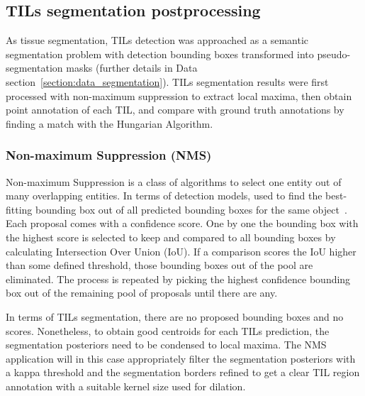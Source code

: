 \subsection{TILs segmentation postprocessing}
As tissue segmentation, TILs detection was approached as a semantic
segmentation problem with detection bounding boxes transformed into
pseudo-segmentation masks (further details in Data section~\ref{section:data_segmentation}).
TILs segmentation results were first processed with non-maximum suppression
to extract local maxima, then obtain point annotation of each TIL, and compare
with ground truth annotations by finding a match with the Hungarian Algorithm.

\subsubsection{Non-maximum Suppression (NMS)}
Non-maximum Suppression is a class of algorithms to select
one entity out of many overlapping entities. In terms of
detection models, used to find the best-fitting bounding box out of all predicted
bounding boxes for the same object~\cite{bodla2017soft}.
Each proposal comes with a confidence score. One by one the bounding box with
the highest score is selected to keep and compared to all bounding boxes by calculating Intersection Over Union (IoU).
If a comparison scores the IoU higher than some defined threshold,
those bounding boxes out of the pool are eliminated.
The process is repeated by picking the highest confidence bounding box out of the
remaining pool of proposals until there are any.

In terms of TILs segmentation, there are no proposed bounding boxes and no scores.
Nonetheless, to obtain good centroids for each TILs prediction, the segmentation posteriors
need to be condensed to local maxima. The NMS application will in this case appropriately
filter the segmentation posteriors with a kappa threshold and the segmentation borders
refined to get a clear TIL region annotation with a suitable kernel size used for dilation.

